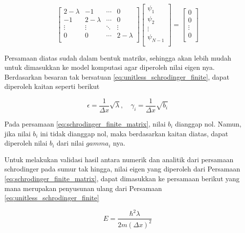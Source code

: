 \begin{equation} \label{eq:schrodinger_finite_matrix}
	\begin{bmatrix}
		2 - \lambda & -1          & \cdots & 0           \\
		-1          & 2 - \lambda & \cdots & 0           \\
		\vdots      & \vdots      & \ddots & \vdots      \\
		0           & 0           & \cdots & 2 - \lambda \\
	\end{bmatrix}
	\begin{bmatrix}
		\psi_1     \\
		\psi_2     \\
		\vdots     \\
		\psi_{N-1} \\
	\end{bmatrix}
	= \begin{bmatrix}
		0      \\
		0      \\
		\vdots \\
		0      \\
	\end{bmatrix}
\end{equation}

\noindent
Persamaan diatas sudah dalam bentuk matriks, sehingga akan lebih mudah untuk dimasukkan ke model komputasi agar diperoleh nilai eigen nya. Berdasarkan besaran tak bersatuan \ref{eq:unitless_schrodinger_finite}, dapat diperoleh kaitan seperti berikut

\begin{equation}
	\epsilon = \frac{1}{\Delta x} \sqrt{\lambda}, \quad \gamma_i = \frac{1}{\Delta x} \sqrt{b_i}
\end{equation}

\noindent
Pada persamaan \ref{eq:schrodinger_finite_matrix}, nilai $b_i$ dianggap nol. Namun, jika nilai $b_i$ ini tidak dianggap nol, maka berdasarkan kaitan diatas, dapat diperoleh nilai $b_i$ dari nilai $gamma_i$ nya.

Untuk melakukan validasi hasil antara numerik dan analitik dari persamaan schrodinger pada sumur tak hingga, nilai eigen yang diperoleh dari Persamaan \ref{eq:schrodinger_finite_matrix}, dapat dimasukkan ke persamaan berikut yang mana merupakan penyusunan ulang dari Persamaan \ref{eq:unitless_schrodinger_finite}

\begin{equation} \label{eq:numerical_energy}
	E = \frac{\hbar^2 \lambda}{2m (\Delta x)^2}
\end{equation}

